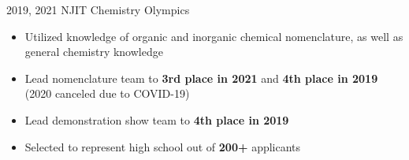 \documentclass[12]{article}
\begin{document}
\entry
{2019, 2021}
{NJIT Chemistry Olympics}
{
  \begin{itemize}
  \item Utilized knowledge of organic and inorganic chemical nomenclature, as well as general chemistry knowledge
  \item Lead nomenclature team to \textbf{3rd place in 2021} and \textbf{4th place in 2019} (2020 canceled due to COVID-19)
  \item Lead demonstration show team to \textbf{4th place in 2019}
  \item Selected to represent high school out of \textbf{200+} applicants
  \end{itemize}
}
\end{document}
